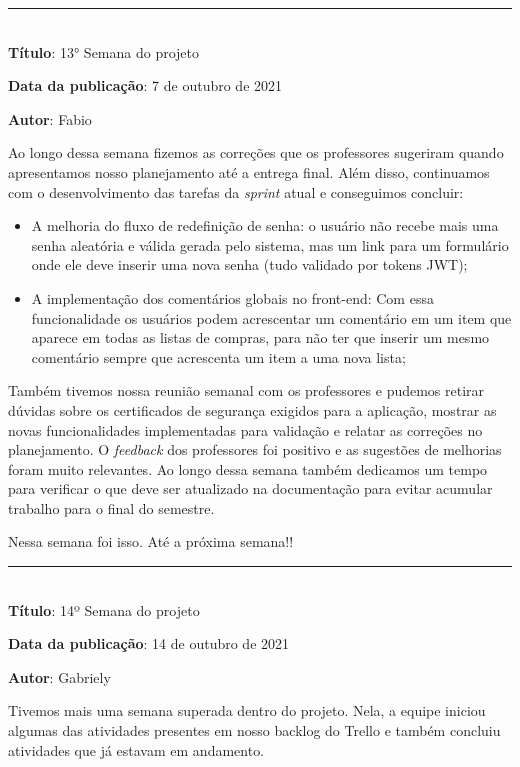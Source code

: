 \protect\rule{13cm}{.5pt}
\\

\textbf{Título}: 13° Semana do projeto

\textbf{Data da publicação}: 7 de outubro de 2021

\textbf{Autor}: Fabio

Ao longo dessa semana fizemos as correções que os professores sugeriram quando apresentamos nosso planejamento até a entrega final. Além disso, continuamos com o desenvolvimento das tarefas da \textit{\gls{sprint}} atual e conseguimos concluir: 

\begin{itemize} 
	\item A melhoria do fluxo de redefinição de senha: o usuário não recebe mais uma senha aleatória e válida gerada pelo sistema, mas um link para um formulário onde ele deve inserir uma nova senha (tudo validado por tokens JWT); 
	\item A implementação dos comentários globais no front-end: Com essa funcionalidade os usuários podem acrescentar um comentário em um item que aparece em todas as listas de compras, para não ter que inserir um mesmo comentário sempre que acrescenta um item a uma nova lista;
\end{itemize}

Também tivemos nossa reunião semanal com os professores e pudemos retirar dúvidas sobre os certificados de segurança exigidos para a aplicação, mostrar as novas funcionalidades implementadas para validação e relatar as correções no planejamento. O \textit{feedback} dos professores foi positivo e as sugestões de melhorias foram muito relevantes.
Ao longo dessa semana também dedicamos um tempo para verificar o que deve ser atualizado na documentação para evitar acumular trabalho para o final do semestre.

Nessa semana foi isso. Até a próxima semana!! \\

\protect\rule{13cm}{.5pt}
\\

\textbf{Título}: 14º Semana do projeto

\textbf{Data da publicação}: 14 de outubro de 2021

\textbf{Autor}: Gabriely

 Tivemos mais uma semana superada dentro do projeto. Nela, a equipe iniciou algumas das atividades presentes em nosso backlog do Trello e também concluiu atividades que já estavam em andamento. 

